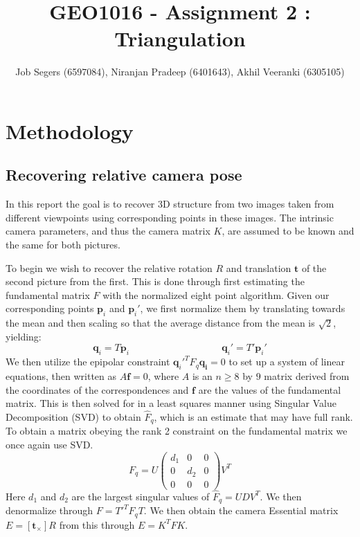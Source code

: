 \documentclass{article}
\title{GEO1016 - Assignment 2 : Triangulation}
\author{Job Segers (6597084), Niranjan Pradeep (6401643), Akhil Veeranki (6305105)}
\begin{document}
\maketitle

\section{Methodology}
\subsection{Recovering relative camera pose}
In this report the goal is to recover 3D structure from two images taken from different viewpoints using corresponding points in these images. The intrinsic camera parameters, and thus the camera matrix $K$, are assumed to be known and the same for both pictures.

To begin we wish to recover the relative rotation $R$ and translation $\mathbf{t}$ of the second picture from the first. This is done through first estimating the fundamental matrix $F$ with the normalized eight point algorithm. Given our corresponding points $\mathbf{p}_i $ and $\mathbf{p}_i'$, we first normalize them by translating towards the mean and then scaling so that the average distance from the mean is $\sqrt{2}$, yielding: 
\[
\mathbf{q}_i = T\mathbf{p}_i \hspace{4cm} \mathbf{q}_i' = T'\mathbf{p}_i'
\]
We then utilize the epipolar constraint $\mathbf{q}_i'^TF_q\mathbf{q_i} = 0$ to set up a system of linear equations, then written as $A\mathbf{f}=0$, where $A$ is an $n \geq 8$ by $9$ matrix derived from the coordinates of the correspondences and $\mathbf{f}$ are the values of the fundamental matrix. This is then solved for in a least squares manner using Singular Value Decomposition (SVD) to obtain $\hat{F}_q$, which is an estimate that may have full rank. To obtain a matrix obeying the rank 2 constraint on the fundamental matrix we once again use SVD. 
\[
F_q = U\begin{pmatrix}
    d_1 & 0 & 0 \\
    0 & d_2 & 0 \\
    0 & 0 & 0
\end{pmatrix}V^T
\]
Here $d_1$ and $d_2$ are the largest singular values of $\hat{F}_q = UDV^T$. We then denormalize through $F = T'^TF_qT$. We then obtain the camera Essential matrix $E = [\mathbf{t}_\times]R$ from this through $E = K^TFK$.
\end{document}
